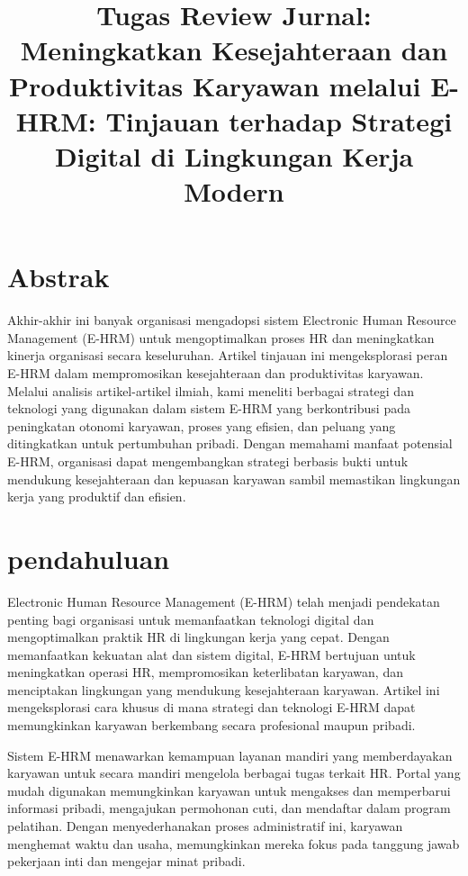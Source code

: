 \documentclass{article}
\title{Tugas Review Jurnal: Meningkatkan Kesejahteraan dan Produktivitas Karyawan melalui E-HRM: Tinjauan terhadap Strategi Digital di Lingkungan Kerja Modern}
\begin{document}
\maketitle

\section*{Abstrak}
Akhir-akhir ini banyak organisasi  mengadopsi sistem Electronic Human Resource Management (E-HRM) untuk mengoptimalkan proses HR dan meningkatkan kinerja organisasi secara keseluruhan. Artikel tinjauan ini mengeksplorasi peran E-HRM dalam mempromosikan kesejahteraan dan produktivitas karyawan. Melalui analisis artikel-artikel ilmiah, kami meneliti berbagai strategi dan teknologi yang digunakan dalam sistem E-HRM yang berkontribusi pada peningkatan otonomi karyawan, proses yang efisien, dan peluang yang ditingkatkan untuk pertumbuhan pribadi. Dengan memahami manfaat potensial E-HRM, organisasi dapat mengembangkan strategi berbasis bukti untuk mendukung kesejahteraan dan kepuasan karyawan sambil memastikan lingkungan kerja yang produktif dan efisien.

\section*{pendahuluan}




Electronic Human Resource Management (E-HRM) telah 
menjadi pendekatan penting bagi organisasi untuk memanfaatkan 
teknologi digital dan mengoptimalkan praktik HR di lingkungan kerja yang cepat. Dengan memanfaatkan kekuatan alat dan sistem digital, E-HRM bertujuan untuk meningkatkan operasi HR, mempromosikan keterlibatan karyawan, dan menciptakan lingkungan yang mendukung kesejahteraan karyawan. Artikel ini mengeksplorasi cara khusus di mana strategi dan teknologi E-HRM dapat memungkinkan karyawan berkembang secara profesional maupun pribadi.

Sistem E-HRM menawarkan kemampuan layanan mandiri yang memberdayakan karyawan untuk secara mandiri mengelola berbagai tugas terkait HR. Portal yang mudah digunakan memungkinkan karyawan untuk mengakses dan memperbarui informasi pribadi, mengajukan permohonan cuti, dan mendaftar dalam program pelatihan. Dengan menyederhanakan proses administratif ini, karyawan menghemat waktu dan usaha, memungkinkan mereka fokus pada tanggung jawab pekerjaan inti dan mengejar minat pribadi.
\end{document}
